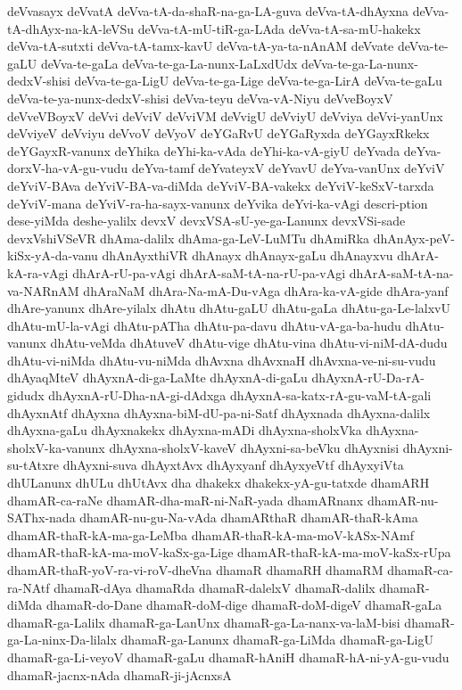 {deVvasayx
deVvatA
deVva-tA-da-shaR-na-ga-LA-guva
deVva-tA-dhAyxna
deVva-tA-dhAyx-na-kA-leVSu
deVva-tA-mU-tiR-ga-LAda
deVva-tA-sa-mU-hakekx
deVva-tA-sutxti
deVva-tA-tamx-kavU
deVva-tA-ya-ta-nAnAM
deVvate
deVva-te-gaLU
deVva-te-gaLa
deVva-te-ga-La-nunx-LaLxdUdx
deVva-te-ga-La-nunx-dedxV-shisi
deVva-te-ga-LigU
deVva-te-ga-Lige
deVva-te-ga-LirA
deVva-te-gaLu
deVva-te-ya-nunx-dedxV-shisi
deVva-teyu
deVva-vA-Niyu
deVveBoyxV
deVveVBoyxV
deVvi
deVviV
deVviVM
deVvigU
deVviyU
deVviya
deVvi-yanUnx
deVviyeV
deVviyu
deVvoV
deVyoV
deYGaRvU
deYGaRyxda
deYGayxRkekx
deYGayxR-vanunx
deYhika
deYhi-ka-vAda
deYhi-ka-vA-giyU
deYvada
deYva-dorxV-ha-vA-gu-vudu
deYva-tamf
deYvateyxV
deYvavU
deYva-vanUnx
deYviV
deYviV-BAva
deYviV-BA-va-diMda
deYviV-BA-vakekx
deYviV-keSxV-tarxda
deYviV-mana
deYviV-ra-ha-sayx-vanunx
deYvika
deYvi-ka-vAgi
descri-ption
dese-yiMda
deshe-yalilx
devxV
devxVSA-sU-ye-ga-Lanunx
devxVSi-sade
devxVshiVSeVR
dhAma-dalilx
dhAma-ga-LeV-LuMTu
dhAmiRka
dhAnAyx-peV-kiSx-yA-da-vanu
dhAnAyxthiVR
dhAnayx
dhAnayx-gaLu
dhAnayxvu
dhArA-kA-ra-vAgi
dhArA-rU-pa-vAgi
dhArA-saM-tA-na-rU-pa-vAgi
dhArA-saM-tA-na-va-NARnAM
dhAraNaM
dhAra-Na-mA-Du-vAga
dhAra-ka-vA-gide
dhAra-yanf
dhAre-yanunx
dhAre-yilalx
dhAtu
dhAtu-gaLU
dhAtu-gaLa
dhAtu-ga-Le-lalxvU
dhAtu-mU-la-vAgi
dhAtu-pATha
dhAtu-pa-davu
dhAtu-vA-ga-ba-hudu
dhAtu-vanunx
dhAtu-veMda
dhAtuveV
dhAtu-vige
dhAtu-vina
dhAtu-vi-niM-dA-dudu
dhAtu-vi-niMda
dhAtu-vu-niMda
dhAvxna
dhAvxnaH
dhAvxna-ve-ni-su-vudu
dhAyaqMteV
dhAyxnA-di-ga-LaMte
dhAyxnA-di-gaLu
dhAyxnA-rU-Da-rA-gidudx
dhAyxnA-rU-Dha-nA-gi-dAdxga
dhAyxnA-sa-katx-rA-gu-vaM-tA-gali
dhAyxnAtf
dhAyxna
dhAyxna-biM-dU-pa-ni-Satf
dhAyxnada
dhAyxna-dalilx
dhAyxna-gaLu
dhAyxnakekx
dhAyxna-mADi
dhAyxna-sholxVka
dhAyxna-sholxV-ka-vanunx
dhAyxna-sholxV-kaveV
dhAyxni-sa-beVku
dhAyxnisi
dhAyxni-su-tAtxre
dhAyxni-suva
dhAyxtAvx
dhAyxyanf
dhAyxyeVtf
dhAyxyiVta
dhULanunx
dhULu
dhUtAvx
dha
dhakekx
dhakekx-yA-gu-tatxde
dhamARH
dhamAR-ca-raNe
dhamAR-dha-maR-ni-NaR-yada
dhamARnanx
dhamAR-nu-SAThx-nada
dhamAR-nu-gu-Na-vAda
dhamARthaR
dhamAR-thaR-kAma
dhamAR-thaR-kA-ma-ga-LeMba
dhamAR-thaR-kA-ma-moV-kASx-NAmf
dhamAR-thaR-kA-ma-moV-kaSx-ga-Lige
dhamAR-thaR-kA-ma-moV-kaSx-rUpa
dhamAR-thaR-yoV-ra-vi-roV-dheVna
dhamaR
dhamaRH
dhamaRM
dhamaR-ca-ra-NAtf
dhamaR-dAya
dhamaRda
dhamaR-dalelxV
dhamaR-dalilx
dhamaR-diMda
dhamaR-do-Dane
dhamaR-doM-dige
dhamaR-doM-digeV
dhamaR-gaLa
dhamaR-ga-Lalilx
dhamaR-ga-LanUnx
dhamaR-ga-La-nanx-va-laM-bisi
dhamaR-ga-La-ninx-Da-lilalx
dhamaR-ga-Lanunx
dhamaR-ga-LiMda
dhamaR-ga-LigU
dhamaR-ga-Li-veyoV
dhamaR-gaLu
dhamaR-hAniH
dhamaR-hA-ni-yA-gu-vudu
dhamaR-jacnx-nAda
dhamaR-ji-jAcnxsA
}
